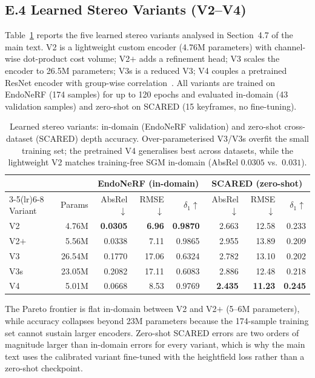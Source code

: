 \documentclass[review]{elsarticle}
\begin{document}
\subsection*{E.4 Learned Stereo Variants (V2--V4)}

Table~\ref{tab:supp_learned_variants} reports the five learned stereo variants analysed in Section~4.7 of the main text. V2 is a lightweight custom encoder (4.76M parameters) with channel-wise dot-product cost volume; V2$+$ adds a refinement head; V3 scales the encoder to 26.5M parameters; V3s is a reduced V3; V4 couples a pretrained ResNet encoder with group-wise correlation~\cite{guo2019gwcnet}. All variants are trained on EndoNeRF (174 samples) for up to 120 epochs and evaluated in-domain (43 validation samples) and zero-shot on SCARED (15 keyframes, no fine-tuning).

\begin{table}[h]
\centering
\caption{Learned stereo variants: in-domain (EndoNeRF validation) and zero-shot cross-dataset (SCARED) depth accuracy. Over-parameterised V3/V3s overfit the small training set; the pretrained V4 generalises best across datasets, while the lightweight V2 matches training-free SGM in-domain (AbsRel $0.0305$ vs.\ $0.031$).}
\label{tab:supp_learned_variants}
\setlength{\tabcolsep}{4pt}
\renewcommand{\arraystretch}{1.08}
\footnotesize
\begin{tabular}{lrrrrrrr}
\toprule
 & & \multicolumn{3}{c}{EndoNeRF (in-domain)} & \multicolumn{3}{c}{SCARED (zero-shot)} \\
\cmidrule(lr){3-5}\cmidrule(lr){6-8}
Variant & Params & AbsRel$\downarrow$ & RMSE$\downarrow$ & $\delta_1$$\uparrow$ & AbsRel$\downarrow$ & RMSE$\downarrow$ & $\delta_1$$\uparrow$ \\
\midrule
V2 & 4.76M & \textbf{0.0305} & \textbf{6.96} & \textbf{0.9870} & 2.663 & 12.58 & 0.233 \\
V2$+$ & 5.56M & 0.0338 & 7.11 & 0.9865 & 2.955 & 13.89 & 0.209 \\
V3 & 26.54M & 0.1770 & 17.06 & 0.6324 & 2.782 & 13.10 & 0.202 \\
V3s & 23.05M & 0.2082 & 17.11 & 0.6083 & 2.886 & 12.48 & 0.218 \\
V4 & 5.01M & 0.0668 & 8.53 & 0.9769 & \textbf{2.435} & \textbf{11.23} & \textbf{0.245} \\
\bottomrule
\end{tabular}
\end{table}

The Pareto frontier is flat in-domain between V2 and V2$+$ (5--6M parameters), while accuracy collapses beyond 23M parameters because the 174-sample training set cannot sustain larger encoders. Zero-shot SCARED errors are two orders of magnitude larger than in-domain errors for every variant, which is why the main text uses the calibrated variant fine-tuned with the heightfield loss rather than a zero-shot checkpoint.
\end{document}
